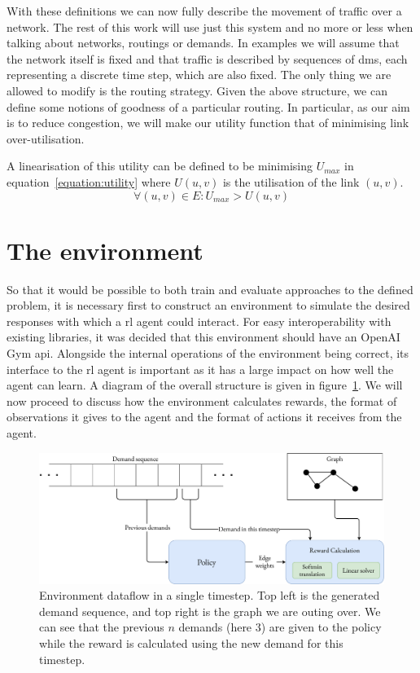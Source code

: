 With these definitions we can now fully describe the movement of traffic over a network. The rest of this work will use just this system and no more or less when talking about networks, routings or demands. In examples we will assume that the network itself is fixed and that traffic is described by sequences of \acp{dm}, each representing a discrete time step, which are also fixed. The only thing we are allowed to modify is the routing strategy. Given the above structure, we can define some notions of goodness of a particular routing. In particular, as our aim is to reduce congestion, we will make our utility function that of minimising link over-utilisation.

A linearisation of this utility can be defined to be minimising $U_{max}$ in equation~\ref{equation:utility} where $U(u,v)$ is the utilisation of the link $(u,v)$.
\begin{equation}
  \label{equation:utility}
  \forall (u,v) \in E: U_{max} > U(u,v)
\end{equation}


\section{The environment}
So that it would be possible to both train and evaluate approaches to the defined problem, it is necessary first to construct an environment to simulate the desired responses with which a \ac{rl} agent could interact. For easy interoperability with existing libraries, it was decided that this environment should have an OpenAI Gym\cite{brockman2016openai} \acs{api}. Alongside the internal operations of the environment being correct, its interface to the \ac{rl} agent is important as it has a large impact on how well the agent can learn. A diagram of the overall structure is given in figure~\ref{fig:environment}. We will now proceed to discuss how the environment calculates rewards, the format of observations it gives to the agent and the format of actions it receives from the agent.

\begin{figure}
  \centering
  \includegraphics[width=\textwidth]{figures/environment.pdf}
  \caption{Environment dataflow in a single timestep. Top left is the generated demand sequence, and top right is the graph we are outing over. We can see that the previous $n$ demands (here 3) are given to the policy while the reward is calculated using the new demand for this timestep.}
  \label{fig:environment}
\end{figure}

